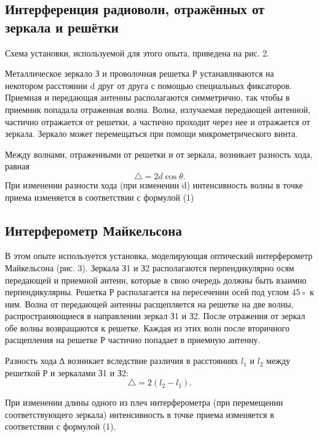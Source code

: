 \documentclass[a4paper]{article}
\begin{document}
\subsection{Интерференция радиоволн, отражённых от зеркала и решётки}
Схема установки, используемой для этого опыта, приведена на рис. 2. \par
Металлическое зеркало З и проволочная решетка Р устанавливаются на некотором расстоянии d
друг от друга с помощью специальных фиксаторов. Приемная и передающая антенны располагаются
симметрично, так чтобы в приемник попадала отраженная волна.
Волна, излучаемая передающей антенной, частично отражается от решетки, а частично проходит через нее и отражается от зеркала. Зеркало может перемещаться при помощи микрометрического винта. \par 
Между волнами, отраженными от решетки и от зеркала, возникает разность хода, равная
\begin{equation}
    \triangle = 2 d \cos \theta.
\end{equation}
При изменении разности хода (при изменении d) интенсивность волны в точке приема изменяется в соответствии с формулой (1)

\subsection{Интерферометр Майкельсона}
В этом опыте используется установка, моделирующая оптический интерферометр Майкельсона (рис. 3). Зеркала З1 и З2 располагаются перпендикулярно осям
передающей и приемной антенн, которые в свою очередь должны быть взаимно перпендикулярны. Решетка Р располагается на пересечении осей под углом 45◦ к ним. Волна от передающей антенны
расщепляется на решетке на две волны, распространяющиеся в направлении зеркал З1 и З2. После отражения от зеркал обе волны
возвращаются к решетке. Каждая из этих волн после вторичного расщепления на решетке Р частично попадает в приемную антенну. \par

Разность хода ∆ возникает вследствие различия в расстояниях
$l_1$ и $l_2$ между решеткой Р и зеркалами З1 и З2:
\begin{equation}
    \triangle = 2 (l_2 - l_1).
\end{equation}

При изменении длины одного из плеч интерферометра (при перемещении соответствующего зеркала) интенсивность в точке
приема изменяется в соответствии с формулой (1). \par
\end{document}
